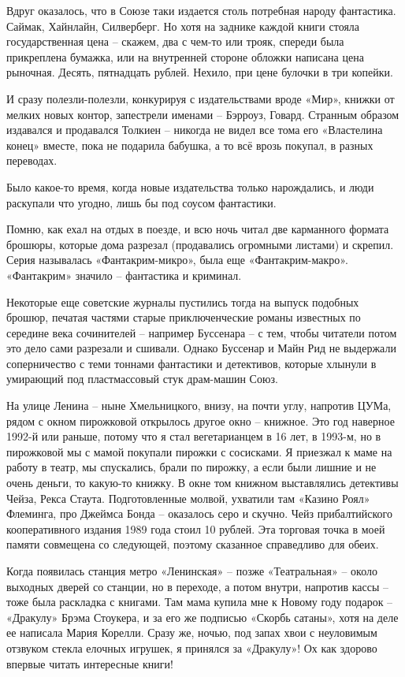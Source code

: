 Вдруг оказалось, что в Союзе таки издается столь потребная народу фантастика. Саймак, Хайнлайн, Силверберг. Но хотя на заднике каждой книги стояла государственная цена – скажем, два с чем-то или трояк, спереди была прикреплена бумажка, или на внутренней стороне обложки написана цена рыночная. Десять, пятнадцать рублей. Нехило, при цене булочки в три копейки.

И сразу полезли-полезли, конкурируя с издательствами вроде «Мир», книжки от мелких новых контор, запестрели именами – Бэрроуз, Говард. Странным образом издавался и продавался Толкиен – никогда не видел все тома его «Властелина конец» вместе, пока не подарила бабушка, а то всё врозь покупал, в разных переводах.

Было какое-то время, когда новые издательства только нарождались, и люди раскупали что угодно, лишь бы под соусом фантастики. 

Помню, как ехал на отдых в поезде, и всю ночь читал две карманного формата брошюры, которые дома разрезал (продавались огромными листами) и скрепил. Серия называлась «Фантакрим-микро», была еще «Фантакрим-макро». «Фантакрим» значило – фантастика и криминал. 

Некоторые еще советские журналы пустились тогда на выпуск подобных брошюр, печатая частями старые приключенческие романы известных по середине века сочинителей – например Буссенара – с тем, чтобы читатели потом это дело сами разрезали и сшивали. Однако Буссенар и Майн Рид не выдержали соперничество с теми тоннами фантастики и детективов, которые хлынули в умирающий под пластмассовый стук драм-машин Союз.

На улице Ленина – ныне Хмельницкого, внизу, на почти углу, напротив ЦУМа, рядом с окном пирожковой открылось другое окно – книжное. Это год наверное 1992-й или раньше, потому что я стал вегетарианцем в 16 лет, в 1993-м, но в пирожковой мы с мамой покупали пирожки с сосисками. Я приезжал к маме на работу в театр, мы спускались, брали по пирожку, а если были лишние и не очень деньги, то какую-то книжку. В окне том книжном выставлялись детективы Чейза, Рекса Стаута. Подготовленные молвой, ухватили там «Казино Роял» Флеминга, про Джеймса Бонда – оказалось серо и скучно. Чейз прибалтийского кооперативного издания 1989 года стоил 10 рублей. Эта торговая точка в моей памяти совмещена со следующей, поэтому сказанное справедливо для обеих.

Когда появилась станция метро «Ленинская» – позже «Театральная» – около выходных дверей со станции, но в переходе, а потом внутри, напротив кассы – тоже была раскладка с книгами. Там мама купила мне к Новому году подарок – «Дракулу» Брэма Стоукера, и за его же подписью «Скорбь сатаны», хотя на деле ее написала Мария Корелли. Сразу же, ночью, под запах хвои с неуловимым отзвуком стекла елочных игрушек, я принялся за «Дракулу»! Ох как здорово впервые читать интересные книги!

